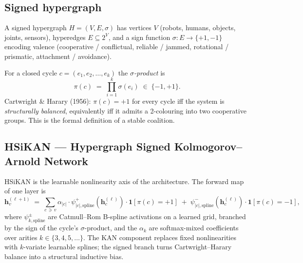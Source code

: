 \documentclass[11pt,a4paper]{article}
\newcommand{\sig}{\ensuremath{\sigma}}
\begin{document}
\subsection{Signed hypergraph}

A signed hypergraph $H = (V, E, \sig)$ has vertices $V$ (robots,
humans, objects, joints, sensors), hyperedges $E \subseteq 2^V$, and
a sign function $\sig: E \to \{+1, -1\}$ encoding valence
(cooperative / conflictual, reliable / jammed, rotational /
prismatic, attachment / avoidance).

For a closed cycle $c = (e_1, e_2, \ldots, e_k)$ the
\emph{$\sig$-product} is
\[
\pi(c) \;=\; \prod_{i=1}^{k} \sig(e_i) \;\in\; \{-1, +1\}.
\]
Cartwright \& Harary (1956): $\pi(c) = +1$ for every cycle iff
the system is \emph{structurally balanced}, equivalently iff it
admits a 2-colouring into two cooperative groups. This is the
formal definition of a stable coalition.

\subsection{HSiKAN --- Hypergraph Signed Kolmogorov--Arnold Network}

HSiKAN is the learnable nonlinearity axis of the architecture. The
forward map of one layer is
\[
\mathbf{h}^{(\ell+1)}_v \;=\;
   \sum_{c \,\ni\, v}
      \alpha_{|c|} \cdot
      \psi^{+}_{|c|, \mathrm{spline}}(\mathbf{h}^{(\ell)}_c)
      \cdot \mathbf{1}[\pi(c) = +1]
   \;+\;
   \psi^{-}_{|c|, \mathrm{spline}}(\mathbf{h}^{(\ell)}_c)
      \cdot \mathbf{1}[\pi(c) = -1],
\]
where $\psi^{\pm}_{k, \mathrm{spline}}$ are Catmull--Rom B-spline
activations on a learned grid, branched by the sign of the cycle's
$\sig$-product, and the $\alpha_k$ are softmax-mixed coefficients
over arities $k \in \{3, 4, 5, \ldots\}$. The KAN component replaces
fixed nonlinearities with $k$-variate learnable splines; the signed
branch turns Cartwright--Harary balance into a structural inductive
bias.
\end{document}
